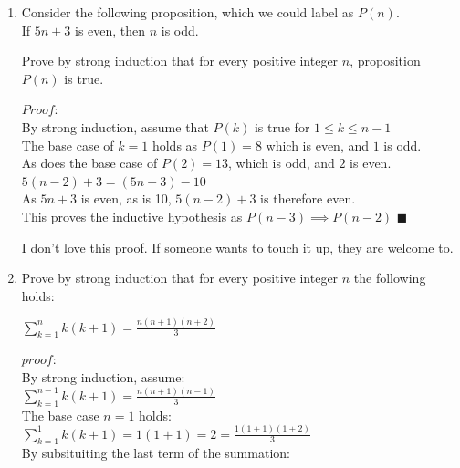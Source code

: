 \documentclass[12pt]{article}
\begin{document}
  
\pagestyle{empty}
 




\vskip0.5in






\begin{enumerate}


\item 
Consider the following proposition, which we could label as $P(n)$. \\
 If $5n+3$ is even, then $n$ is odd. 

Prove by strong induction that for every positive integer $n$, proposition $P(n)$ is true. 


{\color{blue}
 $Proof:$\\
By strong induction, assume that $P(k)$ is true for $1\leqslant k \leqslant n-1$\\
The base case of $k=1$ holds as $P(1)=8$ which is even, and $1$ is odd.\\
As does the base case of $P(2)=13$, which is odd, and $2$ is even.\\
$5(n-2)+3=(5n+3)-10$\\
As $5n+3$ is even, as is 10, $5(n-2)+3$ is therefore even. \\
This proves the inductive hypothesis as $P(n-3)\implies P(n-2)$
$\blacksquare$

I don't love this proof. If someone wants to touch it up, they are welcome to.
}



\newpage

\item Prove by strong induction that for every positive integer $n$ the following holds: 

$\sum\limits_{k=1}^n k(k{+}1) = \frac{n(n{+}1)(n{+}2)}{3}$

{\color{blue}
 $proof\colon$\\
 By strong induction, assume:\\
 $\sum\limits_{k=1}^{n-1} k(k{+}1) = \frac{n(n{+}1)(n-1)}{3}$\\
 The base case $n=1$ holds:\\
$\sum\limits_{k=1}^1 k(k{+}1) = 1(1+1)=2 = \frac{1(1{+}1)(1{+}2)}{3}$\\
 By subsituiting the last term of the summation:\\

}
\end{enumerate}
\end{document}
